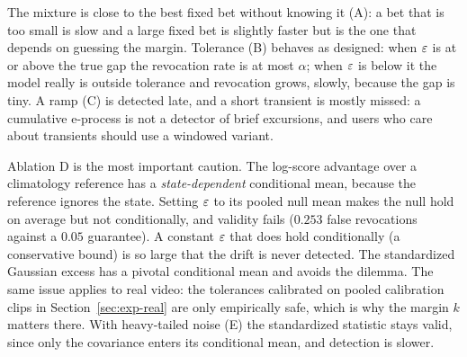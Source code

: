 The mixture is close to the best fixed bet without knowing it (A): a bet that is too small is slow and a large fixed bet is slightly faster but is the one that depends on guessing the margin.
Tolerance (B) behaves as designed: when $\varepsilon$ is at or above the true gap the revocation rate is at most $\alpha$; when $\varepsilon$ is below it the model really is outside tolerance and revocation grows, slowly, because the gap is tiny. A ramp (C) is detected late, and a short transient is mostly missed: a cumulative e-process is not
a detector of brief excursions, and users who care about transients should use a windowed variant.

Ablation D is the most important caution. The log-score advantage over a climatology reference has a \emph{state-dependent} conditional mean, because the reference ignores the state. Setting $\varepsilon$ to its pooled null mean makes the null hold on average but not conditionally, and validity fails
($0.253$ false revocations against a $0.05$ guarantee). A constant $\varepsilon$ that does hold conditionally (a conservative bound) is so large that the drift is never detected. The standardized Gaussian excess has a pivotal conditional mean and avoids the dilemma. The same issue applies to real video: the
tolerances calibrated on pooled calibration clips in Section~\ref{sec:exp-real} are only empirically safe, which is why the margin $k$ matters there. With heavy-tailed noise (E) the standardized statistic stays valid, since only the covariance enters its conditional mean, and detection is slower.
